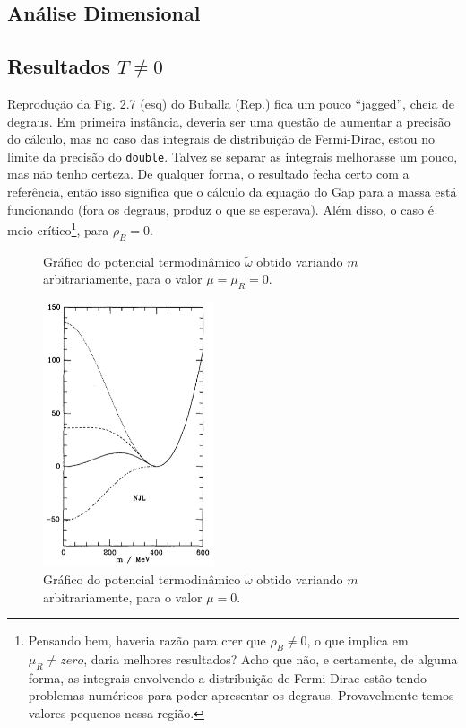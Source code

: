 \subsection{Análise Dimensional}

\subsection{Resultados $T \neq 0$}

Reprodução da Fig. 2.7 (esq) do Buballa (Rep.) fica um pouco ``jagged'', cheia de degraus. Em primeira instância, deveria ser uma questão de aumentar a precisão do cálculo, mas no caso das integrais de distribuição de Fermi-Dirac, estou no limite da precisão do \texttt{double}. Talvez se separar as integrais melhorasse um pouco, mas não tenho certeza. De qualquer forma, o resultado fecha certo com a referência, então isso significa que o cálculo da equação do Gap para a massa está funcionando (fora os degraus, produz o que se esperava). Além disso, o caso é meio crítico\footnote{Pensando bem, haveria razão para crer que $\rho_B \neq 0$, o que implica em $\mu_R \neq zero$, daria melhores resultados? Acho que não, e certamente, de alguma forma, as integrais envolvendo a distribuição de Fermi-Dirac estão tendo problemas numéricos para poder apresentar os degraus. Provavelmente temos valores pequenos nessa região.}, para $\rho_B = 0$. 


\begin{figure}
	
	\caption{Gráfico do potencial termodinâmico $\tilde{\omega}$ obtido variando $m$ arbitrariamente, para o valor $\mu = \mu_R = 0$. \protect}
	\label{Fig:pot_term_analysys_NJL-Buballa_Set_1}
\end{figure}

\begin{figure}
	\centering
	\includegraphics[width=0.45\textwidth]{graphics/Therm_pot_analysis/Pot_buballa.png}
	\caption{Gráfico do potencial termodinâmico $\tilde{\omega}$ obtido variando $m$ arbitrariamente, para o valor $\mu = 0$.}
	\label{Fig:pot_term_analysys_Buballa_NJL-Buballa_Set_1}
\end{figure}

